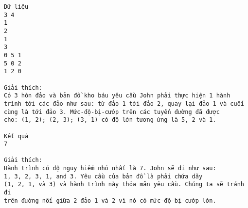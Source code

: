 \begin{verbatim}
Dữ liệu
3 4
1
2
1
3
0 5 1
5 0 2
1 2 0

Giải thích:
Có 3 hòn đảo và bản đồ kho báu yêu cầu John phải thực hiện 1 hành 
trình tới các đảo như sau: từ đảo 1 tới đảo 2, quay lại đảo 1 và cuối 
cùng là tới đảo 3. Mức-độ-bị-cướp trên các tuyến đường đã được 
cho: (1, 2); (2, 3); (3, 1) có độ lớn tương ứng là 5, 2 và 1.

Kết quả
7

Giải thích:
Hành trình có độ nguy hiểm nhỏ nhất là 7. John sẽ đi như sau: 
1, 3, 2, 3, 1, and 3. Yêu cầu của bản đồ là phải chứa dãy
(1, 2, 1, và 3) và hành trình này thỏa mãn yêu cầu. Chúng ta sẽ tránh đi 
trên đường nối giữa 2 đảo 1 và 2 vì nó có mức-độ-bị-cướp lớn.
\end{verbatim}